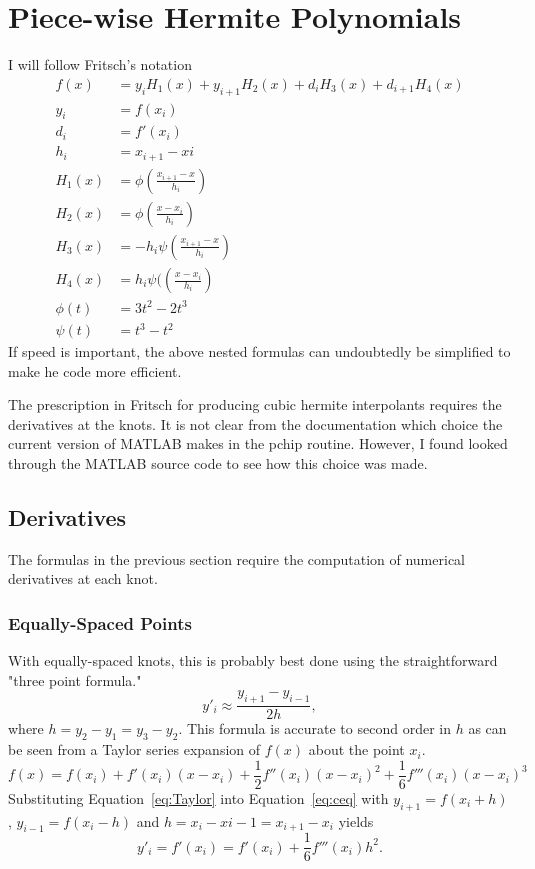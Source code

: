 \documentclass{scrartcl}
\begin{document}
\section{Piece-wise Hermite Polynomials}
I will follow Fritsch's notation\cite{Fritsch}
\begin{align}
f(x) &= y_i H_1(x) + y_{i+1} H_2(x) + d_i H_3(x) + d_{i+1} H_4(x)\\
y_i &= f(x_i)\\
d_i &= f'(x_i)\\
h_i &= x_{i+1}-x{i}\\
H_1(x) &= \phi\left(\frac{x_{i+1}-x}{h_i}\right)\\
H_2(x) &= \phi\left(\frac{x-x_i}{h_i}\right)\\
H_3(x) &= -h_i\psi\left(\frac{x_{i+1}-x}{h_i}\right)\\
H_4(x) &= h_i\psi(\left(\frac{x-x_i}{h_i}\right)\\
\phi(t) &= 3t^2-2t^3\\
\psi(t) &= t^3-t^2
\end{align}
If speed is important, the above nested formulas can undoubtedly
be simplified to make he code more efficient.

The prescription in Fritsch\cite{Fritsch} for producing cubic
hermite interpolants requires the derivatives at the knots. It
is not clear from the documentation which choice the current
version of MATLAB makes in the pchip routine. However, I found
looked through the MATLAB source code to see how this choice
was made.
\subsection{Derivatives}
The formulas in the previous section require the computation of
numerical derivatives at each knot.
\subsubsection{Equally-Spaced Points}
With equally-spaced knots, this
is probably best done using the straightforward "three point formula."
\begin{equation}
y'_i \approx \frac{y_{i+1}-y_{i-1}}{2h},\label{eq:ceq}
\end{equation}
where $h=y_2-y_1=y_3-y_2$.
This formula is accurate to second order in $h$ as can be seen
from a Taylor series expansion of $f(x)$ about the point $x_i$.
\begin{equation}
f(x)=f(x_i)+f'(x_i)(x-x_i)+\frac{1}{2}f''(x_i)(x-x_i)^2+
	\frac{1}{6}f'''(x_i)(x-x_i)^3\label{eq:Taylor}
\end{equation}
Substituting Equation~\ref{eq:Taylor} into Equation~\ref{eq:ceq}
with $y_{i+1}=f(x_i+h)$, $y_{i-1}=f(x_i-h)$ and
$h=x_i-x{i-1}=x_{i+1}-x_i$ yields
\begin{equation}
y'_i=f'(x_i)=f'(x_i)+\frac{1}{6}f'''(x_i)h^2.
\end{equation}
\end{document}
